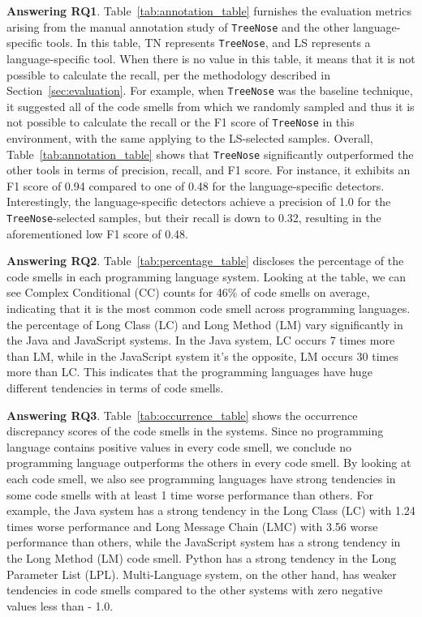 


{\bf Answering RQ1}. Table~\ref{tab:annotation_table} furnishes the evaluation
metrics arising from the manual annotation study of \texttt{TreeNose} and the
other language-specific tools.
%
In this table, TN represents \texttt{TreeNose}, and LS represents a
language-specific tool.
%
When there is no value in this table, it means that it is not possible to
calculate the recall, per the methodology described in
Section~\ref{sec:evaluation}.
%
For example, when \texttt{TreeNose} was the baseline technique, it suggested
all of the code smells from which we randomly sampled and thus it is not
possible to calculate the recall or the F1 score of \texttt{TreeNose} in this
environment, with the same applying to the LS-selected samples.
%
Overall, Table~\ref{tab:annotation_table} shows that \texttt{TreeNose}
significantly outperformed the other tools in terms of precision, recall, and
F1 score.
%
For instance, it exhibits an F1 score of 0.94 compared to one of 0.48 for the
language-specific detectors.
%
Interestingly, the language-specific detectors achieve a precision of 1.0 for
the \texttt{TreeNose}-selected samples, but their recall is down to 0.32,
resulting in the aforementioned low F1 score of 0.48.


{\bf Answering RQ2}. Table~\ref{tab:percentage_table} discloses the percentage
of the code smells in each programming language system. Looking at the table,
we can see Complex Conditional (CC) counts for 46\% of code smells on average,
indicating that it is the most common code smell across programming languages.
the percentage of Long Class (LC) and Long Method (LM) vary significantly in
the Java and JavaScript systems. In the Java system, LC occurs 7 times more
than LM, while in the JavaScript system it's the opposite, LM occurs 30 times
more than LC. This indicates that the programming languages have huge different
tendencies in terms of code smells.

{\bf Answering RQ3}. Table~\ref{tab:occurrence_table} shows the occurrence
discrepancy scores of the code smells in the systems. Since no programming
language contains positive values in every code smell, we conclude no
programming language outperforms the others in every code smell. By looking at
each code smell, we also see programming languages have strong tendencies in
some code smells with at least 1 time worse performance than others. For
example, the Java system has a strong tendency in the Long Class (LC) with 1.24
times worse performance and Long Message Chain (LMC) with 3.56 worse performance than others,
while the JavaScript system has a strong
tendency in the Long Method (LM) code smell. Python has a strong tendency in
the Long Parameter List (LPL). Multi-Language system, on the other hand, has
weaker tendencies in code smells compared to the other systems with zero
negative values less than - 1.0.
